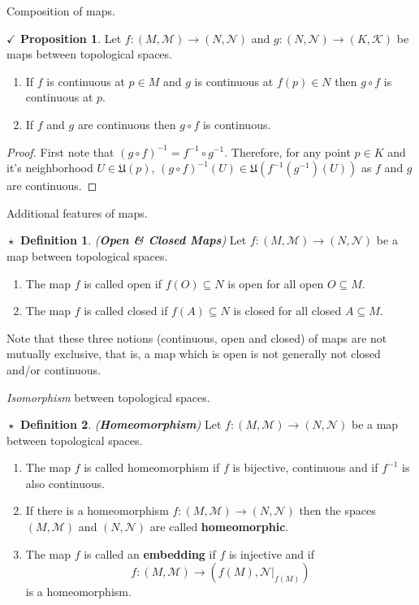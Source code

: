\documentclass{article}
\theoremstyle{definition}
\newtheorem{definition}{$\boxed{\star}$ Definition}
\newcommand{\tit}[1]{\textit{#1}}
\theoremstyle{remark}
\theoremstyle{definition}
\theoremstyle{definition}
\newtheorem{proposition}{$\checkmark$ Proposition}
\newcommand{\topo}[1]{\mathcal{#1}}
\newcommand{\subtopo}[2]{\left. #1 \right\vert_{#2}  }
\newcommand{\nbdsys}[2]{\mathfrak{#1}(#2)}
\begin{document}
\hrulefill
Composition of maps.
\hrulefill
\begin{proposition}
	Let $ f : (M,\topo{M}) \longrightarrow (N,\topo{N})$ and $ g : (N,\topo{N}) \longrightarrow (K,\topo{K}) $ be maps between topological spaces.
	\begin{enumerate}
		\item{If $ f $  is continuous at $ p \in M $ and $ g $ is continuous at $ f(p) \in N$ then $ g\circ f $ is continuous at $ p $.}
		\item{If $ f $ and $ g $ are continuous then $ g \circ f $ is continuous.}
	\end{enumerate}
\end{proposition}
\begin{proof}
	First note that $ (g\circ f)^{-1} =f^{-1}\circ g^{-1} $. Therefore, for any point $ p \in K $ and it's neighborhood $ U \in \nbdsys{U}{p} $, $ (g\circ f)^{-1}(U) \in \nbdsys{U}{f^{-1}(g^{-1})(U)} $ as $ f $ and $ g $ are continuous. 
\end{proof}
\hrulefill
Additional features of maps.
\hrulefill
\begin{definition}
	\tit{(\textbf{Open \& Closed Maps})} Let $ f : (M,\topo{M}) \longrightarrow (N,\topo{N})$ be a map between topological spaces.
	\begin{enumerate}
		\item{The map $ f $ is called open if $ f(O) \subseteq N $ is open for all open $ O \subseteq M $.}
		\item{The map $ f $ is called closed if $ f(A) \subseteq N $ is closed for all closed $ A \subseteq M $.}
	\end{enumerate}
Note that these three notions (continuous, open and closed) of maps are not mutually exclusive, that is, a map which is open is not generally not closed and/or continuous.
\end{definition}
\hrulefill
\tit{Isomorphism} between topological spaces.
\hrulefill
\begin{definition}
	\tit{(\textbf{Homeomorphism})} Let $ f : (M,\topo{M}) \longrightarrow (N,\topo{N}) $ be a map between topological spaces.
	\begin{enumerate}
		\item{The map $ f $ is called homeomorphism if $ f $ is bijective, continuous and if $ f^{-1} $ is also continuous.}
		\item{If there is a homeomorphism $ f : (M,\topo{M}) \longrightarrow (N,\topo{N}) $ then the spaces $ (M,\topo{M}) $ and $ (N,\topo{N}) $ are called \textbf{homeomorphic}.}
		\item{The map $ f $ is called an \textbf{embedding} if $ f $ is injective and if 
	\[f : (M,\topo{M}) \longrightarrow \left( f(M) , \subtopo{\topo{N}}{f(M)} \right)\]
	is a homeomorphism.	
	}
	\end{enumerate}
\end{definition}
\end{document}
